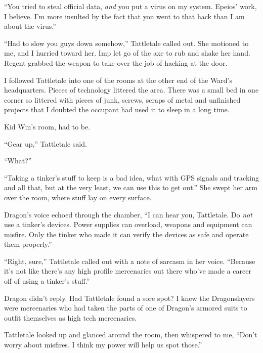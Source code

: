 ``You tried to steal official data, \emph{and} you put a virus on my system.  Epeios' work, I believe.  I'm more insulted by the fact that you went to that hack than I am about the virus.''



``Had to slow you guys down somehow,'' Tattletale called out.  She motioned to me, and I hurried toward her.  Imp let go of the axe to rub and shake her hand.  Regent grabbed the weapon to take over the job of hacking at the door.



I followed Tattletale into one of the rooms at the other end of the Ward's headquarters.  Pieces of technology littered the area.  There was a small bed in one corner so littered with pieces of junk, screws, scraps of metal and unfinished projects that I doubted the occupant had used it to sleep in a long time.



Kid Win's room, had to be.



``Gear up,'' Tattletale said.



``What?''



``Taking a tinker's stuff to keep is a bad idea, what with GPS signals and tracking and all that, but at the very least, we can use this to get out.''  She swept her arm over the room, where stuff lay on every surface.



Dragon's voice echoed through the chamber, ``I can hear you, Tattletale.  Do \emph{not} use a tinker's devices.  Power supplies can overload, weapons and equipment can misfire.  Only the tinker who made it can verify the devices as safe and operate them properly.''



``Right, sure,'' Tattletale called out with a note of sarcasm in her voice.  ``Because it's not like there's any high profile mercenaries out there who've made a career off of using a tinker's stuff.''



Dragon didn't reply.  Had Tattletale found a sore spot?  I knew the Dragonslayers were mercenaries who had taken the parts of one of Dragon's armored suits to outfit themselves as high tech mercenaries.



Tattletale looked up and glanced around the room, then whispered to me, ``Don't worry about misfires.  I think my power will help us spot those.''



